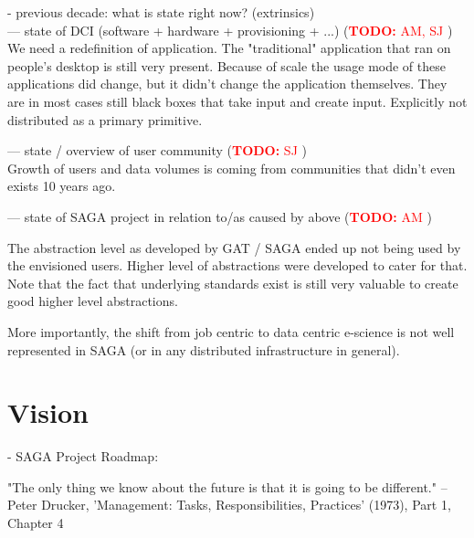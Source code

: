 \documentclass{article}
\newcommand{\B}[1]{\textbf{#1}}
\newcommand{\nind}{\noindent}
\newcommand{\todo}[1]{{\textcolor{red}{\B{TODO:} #1 }}}
\begin{document}
 \nind
 - previous decade: what is state right now? (extrinsics)\\
 --- state of DCI (software + hardware + provisioning + ...) (\todo{AM, SJ})\\
 
We need a redefinition of application. The "traditional" application that ran on people's desktop is still very present.
Because of scale the usage mode of these applications did change, but it didn't change the application themselves.
They are in most cases still black boxes that take input and create input.
Explicitly not distributed as a primary primitive.

 --- state / overview of user community (\todo{SJ})\\
 
 Growth of users and data volumes is coming from communities that didn't even exists 10 years ago.
 
 
 --- state of SAGA project in relation to/as caused by above (\todo{AM})

The abstraction level as developed by GAT / SAGA ended up not being used by the envisioned users.
Higher level of abstractions were developed to cater for that. Note that the fact that underlying standards exist is still very valuable to create good higher level abstractions.

More importantly, the shift from job centric to data centric e-science is not well represented in SAGA (or in any distributed infrastructure in general).

\section{Vision}

 \nind
 - SAGA Project Roadmap:\\

 
 \nind

 "The only thing we know about the future is that it is going to be
 different." -- Peter Drucker, 'Management: Tasks,
 Responsibilities, Practices' (1973), Part 1, Chapter 4\\ 

\end{document}
